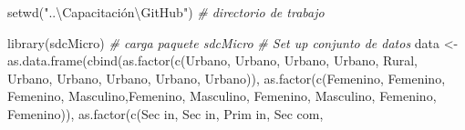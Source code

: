 \documentclass[
]{book}
\newenvironment{Shaded}{\begin{snugshade}}{\end{snugshade}}
\newcommand{\CommentTok}[1]{\textcolor[rgb]{0.56,0.35,0.01}{\textit{#1}}}
\newcommand{\FunctionTok}[1]{\textcolor[rgb]{0.00,0.00,0.00}{#1}}
\newcommand{\NormalTok}[1]{#1}
\newcommand{\OtherTok}[1]{\textcolor[rgb]{0.56,0.35,0.01}{#1}}
\newcommand{\StringTok}[1]{\textcolor[rgb]{0.31,0.60,0.02}{#1}}
\theoremstyle{definition}
\theoremstyle{definition}
\theoremstyle{definition}
\theoremstyle{definition}
\theoremstyle{remark}
\begin{document}
\begin{Shaded}
\begin{Highlighting}[]
\FunctionTok{setwd}\NormalTok{(}\StringTok{"..\textbackslash{}Capacitación\textbackslash{}GitHub"}\NormalTok{) }\CommentTok{\# directorio de trabajo}

\FunctionTok{library}\NormalTok{(sdcMicro) }\CommentTok{\# carga paquete sdcMicro}
\CommentTok{\# Set up conjunto de datos}
\NormalTok{data }\OtherTok{\textless{}{-}} \FunctionTok{as.data.frame}\NormalTok{(}\FunctionTok{cbind}\NormalTok{(}\FunctionTok{as.factor}\NormalTok{(}\FunctionTok{c}\NormalTok{(}\StringTok{\textquotesingle{}Urbano\textquotesingle{}}\NormalTok{, }\StringTok{\textquotesingle{}Urbano\textquotesingle{}}\NormalTok{, }\StringTok{\textquotesingle{}Urbano\textquotesingle{}}\NormalTok{, }\StringTok{\textquotesingle{}Urbano\textquotesingle{}}\NormalTok{,}
                                        \StringTok{\textquotesingle{}Rural\textquotesingle{}}\NormalTok{, }\StringTok{\textquotesingle{}Urbano\textquotesingle{}}\NormalTok{, }\StringTok{\textquotesingle{}Urbano\textquotesingle{}}\NormalTok{, }\StringTok{\textquotesingle{}Urbano\textquotesingle{}}\NormalTok{,}
                                        \StringTok{\textquotesingle{}Urbano\textquotesingle{}}\NormalTok{, }\StringTok{\textquotesingle{}Urbano\textquotesingle{}}\NormalTok{)),}
                            \FunctionTok{as.factor}\NormalTok{(}\FunctionTok{c}\NormalTok{(}\StringTok{\textquotesingle{}Femenino\textquotesingle{}}\NormalTok{, }\StringTok{\textquotesingle{}Femenino\textquotesingle{}}\NormalTok{, }\StringTok{\textquotesingle{}Femenino\textquotesingle{}}\NormalTok{,}
                                        \StringTok{\textquotesingle{}Masculino\textquotesingle{}}\NormalTok{,}\StringTok{\textquotesingle{}Femenino\textquotesingle{}}\NormalTok{, }\StringTok{\textquotesingle{}Masculino\textquotesingle{}}\NormalTok{,}
                                        \StringTok{\textquotesingle{}Femenino\textquotesingle{}}\NormalTok{, }\StringTok{\textquotesingle{}Masculino\textquotesingle{}}\NormalTok{, }\StringTok{\textquotesingle{}Femenino\textquotesingle{}}\NormalTok{,}
                                        \StringTok{\textquotesingle{}Femenino\textquotesingle{}}\NormalTok{)),}
                            \FunctionTok{as.factor}\NormalTok{(}\FunctionTok{c}\NormalTok{(}\StringTok{\textquotesingle{}Sec in\textquotesingle{}}\NormalTok{, }\StringTok{\textquotesingle{}Sec in\textquotesingle{}}\NormalTok{, }\StringTok{\textquotesingle{}Prim in\textquotesingle{}}\NormalTok{, }\StringTok{\textquotesingle{}Sec com\textquotesingle{}}\NormalTok{,}

\end{Highlighting}
\end{Shaded}
\end{document}
